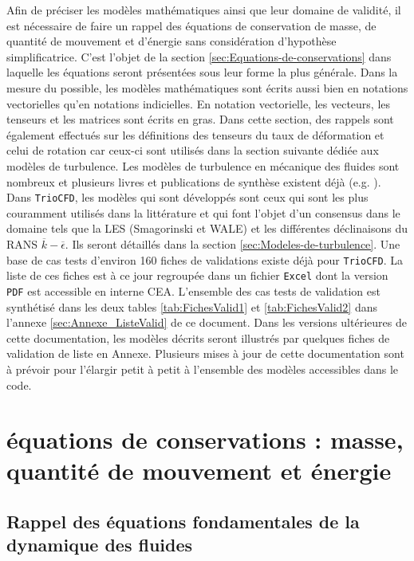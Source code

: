 Afin de pr\'eciser les mod\`eles math\'ematiques ainsi que leur domaine
de validit\'e, il est n\'ecessaire de faire un rappel des \'equations de
conservation de masse, de quantit\'e de mouvement et d'\'energie sans
consid\'eration d'hypoth\`ese simplificatrice. C'est l'objet de la section
\ref{sec:Equations-de-conservations} dans laquelle les \'equations
seront pr\'esent\'ees sous leur forme la plus g\'en\'erale. Dans la mesure
du possible, les mod\`eles math\'ematiques sont \'ecrits aussi bien en notations
vectorielles qu'en notations indicielles. En notation vectorielle,
les vecteurs, les tenseurs et les matrices sont \'ecrits en gras. Dans
cette section, des rappels sont \'egalement effectu\'es sur les d\'efinitions
des tenseurs du taux de d\'eformation et celui de rotation car ceux-ci
sont utilis\'es dans la section suivante d\'edi\'ee aux mod\`eles de turbulence.
Les mod\`eles de turbulence en m\'ecanique des fluides sont nombreux et
plusieurs livres et publications de synth\`ese existent d\'ej\`a (e.g. \cite{Book_Chassaing,Argyropoulos-Markatos_ReviewTurbulence_AMM2015}).
Dans \texttt{TrioCFD}, les mod\`eles qui sont d\'evelopp\'es sont ceux qui
sont les plus couramment utilis\'es dans la litt\'erature et qui font
l'objet d'un consensus dans le domaine tels que la LES (Smagorinski
et WALE) et les diff\'erentes d\'eclinaisons du RANS $\overline{k}-\overline{\epsilon}$.
Ils seront d\'etaill\'es dans la section \ref{sec:Modeles-de-turbulence}.
Une base de cas tests d'environ 160 fiches de validations existe d\'ej\`a
pour \texttt{TrioCFD}. La liste de ces fiches est \`a ce jour regroup\'ee
dans un fichier \texttt{Excel} dont la version \texttt{PDF} est accessible
en interne CEA. L'ensemble des cas tests de validation est synth\'etis\'e
dans les deux tables \ref{tab:FichesValid1} et \ref{tab:FichesValid2}
dans l'annexe \ref{sec:Annexe_ListeValid} de ce document. Dans les
versions ult\'erieures de cette documentation, les mod\`eles d\'ecrits seront
illustr\'es par quelques fiches de validation de liste en Annexe. Plusieurs
mises \`a jour de cette documentation sont \`a pr\'evoir pour l'\'elargir
petit \`a petit \`a l'ensemble des mod\`eles accessibles dans le code.


\section{\label{sec:Equations-de-conservations}\'equations de conservations
: masse, quantit\'e de mouvement et \'energie}


\subsection{Rappel des \'equations fondamentales de la dynamique des fluides}

